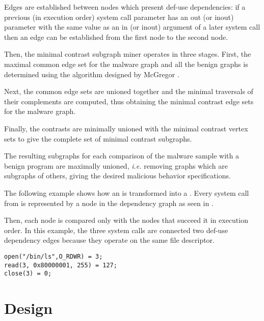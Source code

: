 Edges are established between nodes which present def-use dependencies: if a previous (in execution order) system call parameter has an out (or inout) parameter with the same value as an in (or inout) argument of a later system call then an edge can be established from the first node to the second node.

Then, the minimal contrast subgraph miner operates in three stages. First, the maximal common edge set for the malware graph and all the benign graphs is determined using the algorithm designed by McGregor \cite{common-subgraph}. 

Next, the common edge sets are unioned together and the minimal traversals of their complements are computed, thus obtaining the minimal contrast edge sets for the malware graph.

Finally, the contrasts are minimally unioned with the minimal contrast vertex sets to give the complete set of minimal contrast subgraphs.

The resulting subgraphs for each comparison of the malware sample with a benign program are maximally unioned, \textit{i.e.} removing graphs which are subgraphs of others, giving the desired malicious behavior specifications.

The following example shows how an  is transformed into a . Every system call from  is represented by a node in the dependency graph as seen in . 

Then, each node is compared only with the nodes that succeed it in execution order. In this example, the three system calls are connected two def-use dependency edges because they operate on the same file descriptor.

\newpage

\lstset{language=C,caption=System call trace,label=lst:syscall-trace}
\begin{lstlisting}
open("/bin/ls",O_RDWR) = 3;
read(3, 0x80000001, 255) = 127;
close(3) = 0;
\end{lstlisting}


\section{Design}
\label{third:design}

